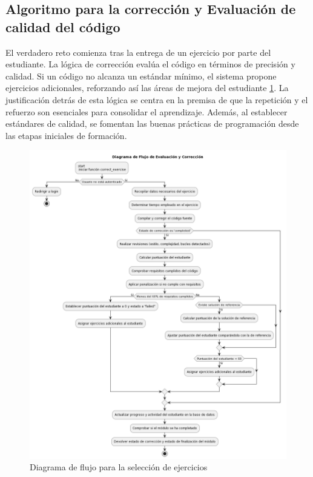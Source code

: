 \subsection{Algoritmo para la corrección y Evaluación de calidad del código}

El verdadero reto comienza tras la entrega de un ejercicio por parte del estudiante. La lógica de corrección evalúa el código en términos de precisión y calidad. Si un código no alcanza un estándar mínimo, el sistema propone ejercicios adicionales, reforzando así las áreas de mejora del estudiante \ref{fig:correccion}. La justificación detrás de esta lógica se centra en la premisa de que la repetición y el refuerzo son esenciales para consolidar el aprendizaje. Además, al establecer estándares de calidad, se fomentan las buenas prácticas de programación desde las etapas iniciales de formación.

\begin{figure}[H]
    \centering
    \includegraphics[width=\textwidth]{imagenes/correcionejercicios.png}
    \caption{Diagrama de flujo para la selección de ejercicios}
    \label{fig:correccion}
    \end{figure}

